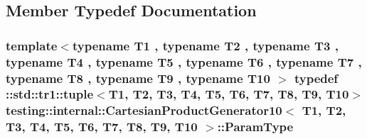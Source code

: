 \subsection{Member Typedef Documentation}
\hypertarget{classtesting_1_1internal_1_1CartesianProductGenerator10_aa483a5910f5dbfb974b43f93853f4b29}{
\subsubsection[{Param\-Type}]{\setlength{\rightskip}{0pt plus 5cm}template$<$typename T1 , typename T2 , typename T3 , typename T4 , typename T5 , typename T6 , typename T7 , typename T8 , typename T9 , typename T10 $>$ typedef \-::{\bf std\-::tr1\-::tuple}$<$T1, T2, T3, T4, T5, T6, T7, T8, T9, T10$>$ {\bf testing\-::internal\-::\-Cartesian\-Product\-Generator10}$<$ T1, T2, T3, T4, T5, T6, T7, T8, T9, T10 $>$\-::{\bf Param\-Type}}}\label{classtesting_1_1internal_1_1CartesianProductGenerator10_aa483a5910f5dbfb974b43f93853f4b29}


